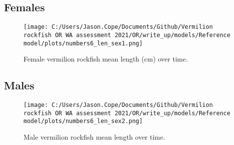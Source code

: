 \documentclass[11pt,
  english,
  a4paper,
]{article}
\begin{document}
\leavevmode\tagmcend\tagstructend


\hypertarget{females-1}{%
\subsection{Females}\label{females-1}}

\leavevmode\tagmcend\tagstructend


\begin{figure}
\centering
\texttt{[image: C:/Users/Jason.Cope/Documents/Github/Vermilion rockfish OR WA assessment 2021/OR/write\_up/models/Reference model/plots/numbers6\_len\_sex1.png]}
\caption{Female vermilion rockfish mean length (cm) over time.\label{fig:num_lts_females}}
\end{figure}

\tagmcend\tagstructend

\clearpage


\hypertarget{males-1}{%
\subsection{Males}\label{males-1}}

\leavevmode\tagmcend\tagstructend


\begin{figure}
\centering
\texttt{[image: C:/Users/Jason.Cope/Documents/Github/Vermilion rockfish OR WA assessment 2021/OR/write\_up/models/Reference model/plots/numbers6\_len\_sex2.png]}
\caption{Male vermilion rockfish mean length over time.\label{fig:num_lts_males}}
\end{figure}

\tagmcend\tagstructend

\clearpage
\end{document}
